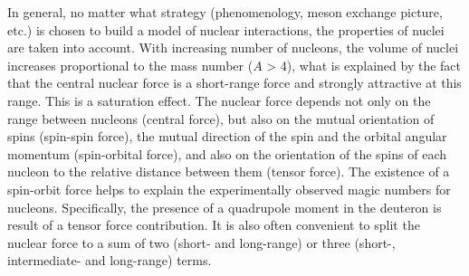 In general, no matter what strategy (phenomenology, meson exchange picture, etc.) is chosen to build a model of nuclear interactions, the properties of nuclei are taken into account. With increasing number of nucleons, the volume of nuclei increases proportional to the mass number ($A$ > 4), what is explained by the fact that the central nuclear force is a short-range force and strongly attractive at this range. This is a saturation effect. The nuclear force depends not only on the range between nucleons (central force), but also on the mutual orientation of spins (spin-spin force), the mutual direction of the spin and the orbital angular momentum (spin-orbital force), and also on the orientation of the spins of each nucleon to the relative distance between them (tensor force). The existence of a spin-orbit force helps to explain the experimentally observed magic numbers for nucleons. Specifically, the presence of a quadrupole moment in the deuteron is result of a tensor force contribution. It is also often convenient to split the nuclear force to a sum of two (short- and long-range) or three (short-, intermediate- and long-range) terms. 

